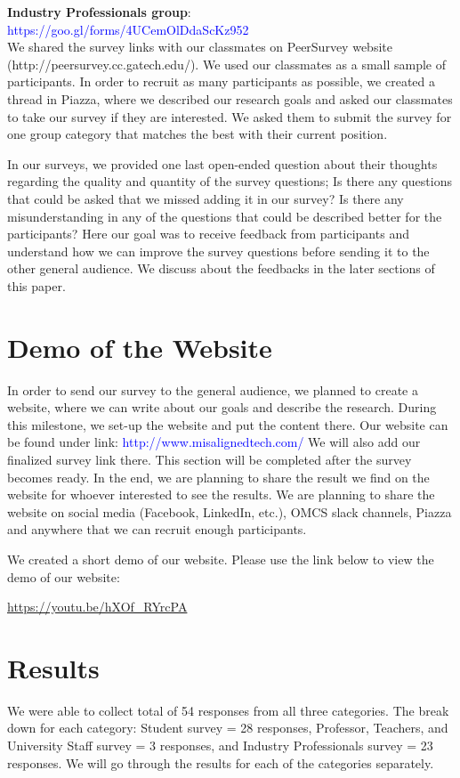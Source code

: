 \documentclass{sigchi}
\begin{document}
\textbf{Industry Professionals group}:\\  \textcolor{blue}{https://goo.gl/forms/4UCemOlDdaScKz952}\\

We shared the survey links with our classmates on PeerSurvey website (http://peersurvey.cc.gatech.edu/). We used our classmates as a small sample of participants. In order to recruit as many participants as possible, we created a thread in Piazza, where we described our research goals and asked our classmates to take our survey if they are interested. We asked them to submit the survey for one group category that matches the best with their current position. 

In our surveys, we provided one last open-ended question about their thoughts regarding the quality and quantity of the survey questions; Is there any questions that could be asked that we missed adding it in our survey? Is there any misunderstanding in any of the questions that could be described better for the participants? Here our goal was to receive feedback from participants and understand how we can improve the survey questions before sending it to the other general audience. We discuss about the feedbacks in the later sections of this paper.

\section{Demo of the Website}
In order to send our survey to the general audience, we planned to create a website, where we can write about our goals and describe the research. During this milestone, we set-up the website and put the content there. Our website can be found under link: \textcolor{blue}{http://www.misalignedtech.com/}
We will also add our finalized survey link there. This section will be completed after the survey becomes ready. In the end, we are planning to share the result we find on the website for whoever interested to see the results. We are planning to share the website on social media (Facebook, LinkedIn, etc.), OMCS slack channels, Piazza and anywhere that we can recruit enough participants.

We created a short demo of our website. Please use the link below to view the demo of our website:

\url{https://youtu.be/hXOf_RYrcPA}


\section{Results}
We were able to collect total of 54 responses from all three categories. The break down for each category: Student survey = 28 responses, Professor, Teachers, and University Staff survey = 3 responses, and Industry Professionals survey = 23 responses.
We will go through the results for each of the categories separately.
\end{document}
